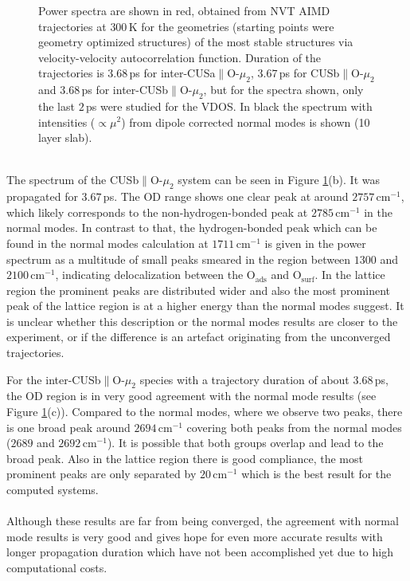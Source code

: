 \documentclass[11pt,DIV=13,BCOR=5mm,a4paper,headinclude]{scrbook}
\begin{document}
\begin{figure}[!h]
             \caption{Power spectra are shown in red, obtained from NVT AIMD trajectories at $300\,$K for the geometries (starting points were geometry optimized structures) of the most stable structures via velocity-velocity autocorrelation function.
Duration of the trajectories is $3.68\,$ps for inter-CUSa$\parallel$O-$\mu_2$, $3.67\,$ps for CUSb$\parallel$O-$\mu_2$ and $3.68\,$ps for inter-CUSb$\parallel$O-$\mu_2$, but for the spectra shown, only the last $2\,$ps were studied for the VDOS.
In black the spectrum with intensities ($\propto\mu^2$) from dipole corrected normal modes is shown (10 layer slab).}
            \label{abb:velvel_ads_spec}
\end{figure}
\\

The spectrum of the CUSb$\parallel$O-$\mu_2$ system can be seen in Figure \ref{abb:velvel_ads_spec}(b).
It was propagated for $3.67\,$ps.
The OD range shows one clear peak at around $2757\,$cm$^{-1}$, which likely corresponds to the non-hydrogen-bonded peak at $2785\,$cm$^{-1}$ in the normal modes.
In contrast to that, the hydrogen-bonded peak which can be found in the normal modes calculation at $1711\,$cm$^{-1}$ is given in the power spectrum as a multitude of small peaks smeared in the region between $1300$ and $2100\,$cm$^{-1}$, indicating delocalization between the O$_\textrm{ads}$ and O$_\textrm{surf}$.
In the lattice region the prominent peaks are distributed wider and also the most prominent peak of the lattice region is at a higher energy than the normal modes suggest.
It is unclear whether this description or the normal modes results are closer to the experiment, or if the difference is an artefact originating from the unconverged trajectories.


For the inter-CUSb$\parallel$O-$\mu_2$ species with a trajectory duration of about $3.68\,$ps, the OD region is in very good agreement with the normal mode results (see Figure \ref{abb:velvel_ads_spec}(c)).
Compared to the normal modes, where we observe two peaks, there is one broad peak around $2694\,$cm$^{-1}$ covering both peaks from the normal modes ($2689$ and $2692\,$cm$^{-1}$).
It is possible that both groups overlap and lead to the broad peak.
Also in the lattice region there is good compliance, the most prominent peaks are only separated by $20\,$cm$^{-1}$ which is the best result for the computed systems.
\\
\\

Although these results are far from being converged, the agreement with normal mode results is very good and gives hope for even more accurate results with longer propagation duration which have not been accomplished yet due to high computational costs.
\end{document}
